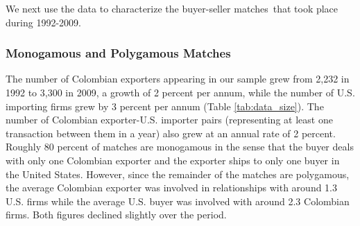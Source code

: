 We next use the data to characterize the buyer-seller matches\ that took
place during 1992-2009.

\subsubsection{Monogamous and Polygamous Matches}

The number of Colombian exporters appearing in our sample grew from 2,232 in
1992 to 3,300 in 2009, a growth of 2 percent per annum, while the number of
U.S. importing firms grew by 3 percent per annum (Table \ref{tab:data_size}). The number of Colombian
exporter-U.S. importer pairs (representing at least one transaction between
them in a year) also grew at an annual rate of 2 percent. Roughly 80 percent
of matches are monogamous in the sense that the buyer deals with only one
Colombian exporter and the exporter ships to only one buyer in the United
States. However, since the remainder of the matches are polygamous, the
average Colombian exporter was involved in relationships with around 1.3
U.S. firms while the average U.S. buyer was involved with around 2.3
Colombian firms. Both figures declined slightly over the period.

